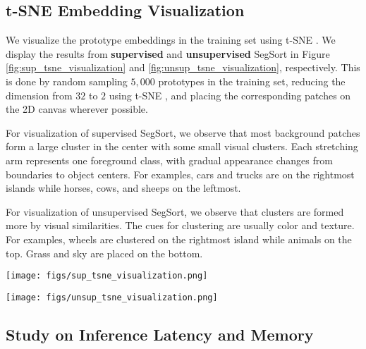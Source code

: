\documentclass[10pt,twocolumn,letterpaper]{article}
\begin{document}
\subsection{t-SNE Embedding Visualization}
\label{sec:tsne}

We visualize the prototype embeddings in the training set using t-SNE \cite{maaten2008visualizing}. We display the results from {\bf supervised} and {\bf unsupervised} SegSort in Figure \ref{fig:sup_tsne_visualization} and \ref{fig:unsup_tsne_visualization}, respectively. This is done by random sampling $5,000$ prototypes in the training set, reducing the dimension from $32$ to $2$ using t-SNE \cite{maaten2008visualizing}, and placing the corresponding patches on the 2D canvas wherever possible. 

For visualization of supervised SegSort, we observe that most background patches form a large cluster in the center with some small visual clusters. Each stretching arm represents one foreground class, with gradual appearance changes from boundaries to object centers. For examples, cars and trucks are on the rightmost islands while horses, cows, and sheeps on the leftmost.

For visualization of unsupervised SegSort, we observe that clusters are formed more by visual similarities. The cues for clustering are usually color and texture. For examples, wheels are clustered on the rightmost island while animals on the top. Grass and sky are placed on the bottom.



\begin{figure*}
    \centering
    \texttt{[image: figs/sup\_tsne\_visualization.png]}
    \caption{t-SNE visualization of prototype embeddings from {\bf supervised} SegSort, framed with category color. Best viewed with zoom-in.}
    \label{fig:sup_tsne_visualization}
\end{figure*}

\begin{figure*}
    \centering
    \texttt{[image: figs/unsup\_tsne\_visualization.png]}
    \caption{t-SNE visualization of prototype embeddings from {\bf unsupervised} SegSort, framed with category color. Best viewed with zoom-in.}
    \label{fig:unsup_tsne_visualization}
\end{figure*}



\subsection{Study on Inference Latency and Memory}
\end{document}
